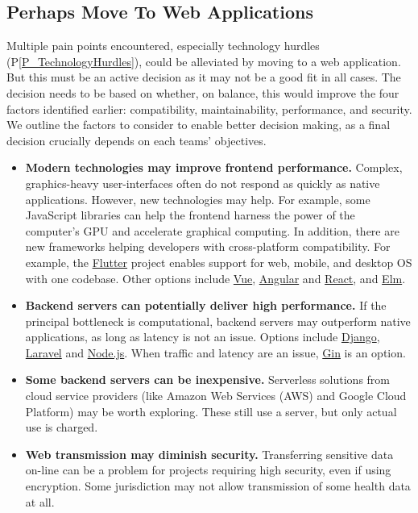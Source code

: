 \documentclass[doubleblind,12pt, 3p, times]{elsarticle}
\newcommand{\ppref}[1]{P\ref{#1}}
\begin{document}
\subsection{Perhaps Move To Web Applications} \label{sec_webapps}

Multiple pain points encountered, especially technology hurdles
(\ppref{P_TechnologyHurdles}), could be alleviated by moving to a web
application. But this must be an active decision as it may not be a good
fit in all cases.  The decision needs to be based on whether, on balance, this
would improve the four factors identified earlier: compatibility,
maintainability, performance, and security. We outline the factors to consider
to enable better decision making, as a final decision crucially depends on
each teams' objectives.

\begin{itemize}

\item \textbf{Modern technologies may improve frontend performance.} 
Complex, graphics-heavy user-interfaces often do not respond as quickly
as native applications.  However, new technologies may help. For example,
some JavaScript libraries can help the frontend harness the power of the
computer's GPU and accelerate graphical computing. In addition, there are new
frameworks helping developers with cross-platform compatibility. For example,
the \href{https://flutter.dev/}{Flutter} project enables support for web,
mobile, and desktop OS with one codebase.  Other options include
\href{https://vuejs.org/} {Vue}, \href{https://angular.io/} {Angular} and
\href{https://reactjs.org/} {React}, and \href{https://elm-lang.org/}{Elm}.  

\item \textbf{Backend servers can potentially deliver high performance.} If
the principal bottleneck is computational, backend servers may outperform
native applications, as long as latency is not an issue.
Options include
\href{https://www.django-rest-framework.org/} {Django}, \href{https://laravel.com/} {Laravel} and
\href{https://nodejs.org/en/} {Node.js}.
When traffic and latency are an issue,
\href{https://github.com/gin-gonic/gin} {Gin} is an option.

\item \textbf{Some backend servers can be inexpensive.} Serverless solutions
from cloud service providers (like Amazon Web Services (AWS) and Google Cloud
Platform) may be worth exploring. These still use a server, but only actual use
is charged. 

\item \textbf{Web transmission may diminish security.} Transferring sensitive
data on-line can be a problem for projects requiring high security, even
if using encryption. Some jurisdiction may not allow transmission of some
health data at all.

\end{itemize}
\end{document}
